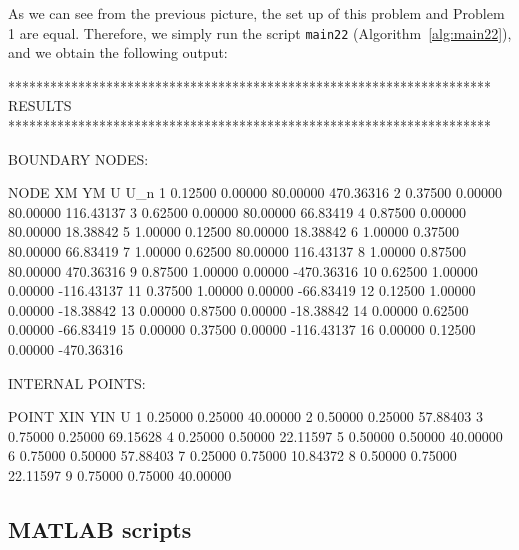 As we can see from the previous picture, the set up of this problem and Problem 1 are equal. Therefore, we simply run the script \texttt{main22} (Algorithm~\ref{alg:main22}), and we obtain the following output:
\begin{matlaboutput}
*********************************************************************
RESULTS
*********************************************************************

BOUNDARY NODES:

NODE        XM            YM            U             U_n
 1        0.12500       0.00000      80.00000     470.36316
 2        0.37500       0.00000      80.00000     116.43137
 3        0.62500       0.00000      80.00000      66.83419
 4        0.87500       0.00000      80.00000      18.38842
 5        1.00000       0.12500      80.00000      18.38842
 6        1.00000       0.37500      80.00000      66.83419
 7        1.00000       0.62500      80.00000     116.43137
 8        1.00000       0.87500      80.00000     470.36316
 9        0.87500       1.00000       0.00000    -470.36316
 10       0.62500       1.00000       0.00000    -116.43137
 11       0.37500       1.00000       0.00000     -66.83419
 12       0.12500       1.00000       0.00000     -18.38842
 13       0.00000       0.87500       0.00000     -18.38842
 14       0.00000       0.62500       0.00000     -66.83419
 15       0.00000       0.37500       0.00000    -116.43137
 16       0.00000       0.12500       0.00000    -470.36316

INTERNAL POINTS:

POINT        XIN           YIN           U
  1        0.25000       0.25000      40.00000
  2        0.50000       0.25000      57.88403
  3        0.75000       0.25000      69.15628
  4        0.25000       0.50000      22.11597
  5        0.50000       0.50000      40.00000
  6        0.75000       0.50000      57.88403
  7        0.25000       0.75000      10.84372
  8        0.50000       0.75000      22.11597
  9        0.75000       0.75000      40.00000
\end{matlaboutput}

\subsection{MATLAB scripts}
\label{sub:matlab_scripts3}%

